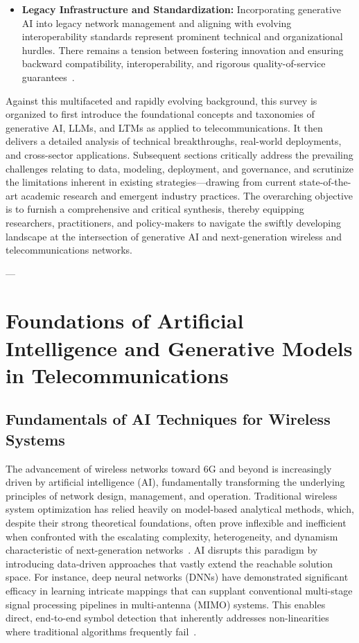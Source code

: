 \documentclass[11pt]{article}
\begin{document}
\begin{itemize}
    \item \textbf{Legacy Infrastructure and Standardization:} Incorporating generative AI into legacy network management and aligning with evolving interoperability standards represent prominent technical and organizational hurdles. There remains a tension between fostering innovation and ensuring backward compatibility, interoperability, and rigorous quality-of-service guarantees~\cite{ref25, ref39, ref40, ref46}.
\end{itemize}

Against this multifaceted and rapidly evolving background, this survey is organized to first introduce the foundational concepts and taxonomies of generative AI, LLMs, and LTMs as applied to telecommunications. It then delivers a detailed analysis of technical breakthroughs, real-world deployments, and cross-sector applications. Subsequent sections critically address the prevailing challenges relating to data, modeling, deployment, and governance, and scrutinize the limitations inherent in existing strategies—drawing from current state-of-the-art academic research and emergent industry practices. The overarching objective is to furnish a comprehensive and critical synthesis, thereby equipping researchers, practitioners, and policy-makers to navigate the swiftly developing landscape at the intersection of generative AI and next-generation wireless and telecommunications networks.

---

\section{Foundations of Artificial Intelligence and Generative Models in Telecommunications}

\subsection{Fundamentals of AI Techniques for Wireless Systems}

The advancement of wireless networks toward 6G and beyond is increasingly driven by artificial intelligence (AI), fundamentally transforming the underlying principles of network design, management, and operation. Traditional wireless system optimization has relied heavily on model-based analytical methods, which, despite their strong theoretical foundations, often prove inflexible and inefficient when confronted with the escalating complexity, heterogeneity, and dynamism characteristic of next-generation networks~\cite{ref46}. AI disrupts this paradigm by introducing data-driven approaches that vastly extend the reachable solution space. For instance, deep neural networks (DNNs) have demonstrated significant efficacy in learning intricate mappings that can supplant conventional multi-stage signal processing pipelines in multi-antenna (MIMO) systems. This enables direct, end-to-end symbol detection that inherently addresses non-linearities where traditional algorithms frequently fail~\cite{ref43}. 
\end{document}
